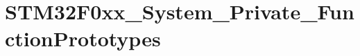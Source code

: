\hypertarget{group___s_t_m32_f0xx___system___private___function_prototypes}{}\section{S\+T\+M32\+F0xx\+\_\+\+System\+\_\+\+Private\+\_\+\+Function\+Prototypes}
\label{group___s_t_m32_f0xx___system___private___function_prototypes}
